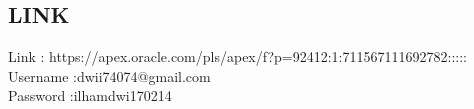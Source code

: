\documentclass{article}
\begin{document}
\begin{enumerate}
\section{LINK}
Link : https://apex.oracle.com/pls/apex/f?p=92412:1:711567111692782:::::
Username :dwii74074@gmail.com\\
Password :ilhamdwi170214\\
      \end{enumerate}
      
       
\end{document}
